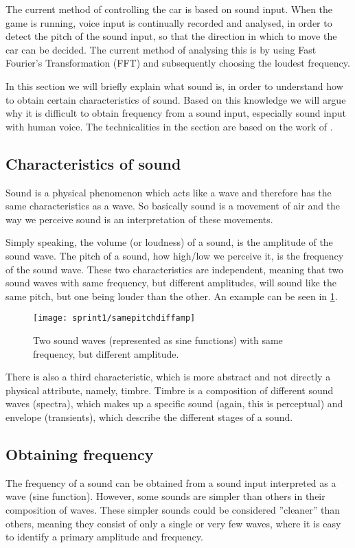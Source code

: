 The current method of controlling the car is based on sound input.
When the game is running, voice input is continually recorded and analysed, in order to detect the pitch of the sound input, so that the direction in which to move the car can be decided.
The current method of analysing this is by using Fast Fourier's Transformation (FFT) and subsequently choosing the loudest frequency.

In this section we will briefly explain what sound is, in order to understand how to obtain certain characteristics of sound.
Based on this knowledge we will argue why it is difficult to obtain frequency from a sound input, especially sound input with human voice.
The technicalities in the section are based on the work of \citet{music-and-computers}.

\subsection{Characteristics of sound}
Sound is a physical phenomenon which acts like a wave and therefore has the same characteristics as a wave.
So basically sound is a movement of air and the way we perceive sound is an interpretation of these movements.

Simply speaking, the volume (or loudness) of a sound, is the amplitude of the sound wave.
The pitch of a sound, how high/low we perceive it, is the frequency of the sound wave.
These two characteristics are independent, meaning that two sound waves with same frequency, but different amplitudes, will sound like the same pitch, but one being louder than the other.
An example can be seen in \cref{fig:samepitchdiffamp}.

\begin{figure}[h]
\centering
\texttt{[image: sprint1/samepitchdiffamp]}
\caption{Two sound waves (represented as sine functions) with same frequency, but different amplitude.}
\label{fig:samepitchdiffamp}
\end{figure}

There is also a third characteristic, which is more abstract and not directly a physical attribute, namely, timbre.
Timbre is a composition of different sound waves (spectra), which makes up a specific sound (again, this is perceptual) and envelope (transients), which describe the different stages of a sound.

\subsection{Obtaining frequency}
The frequency of a sound can be obtained from a sound input interpreted as a wave (sine function).
However, some sounds are simpler than others in their composition of waves.
These simpler sounds could be considered ''cleaner'' than others, meaning they consist of only a single or very few waves, where it is easy to identify a primary amplitude and frequency.

